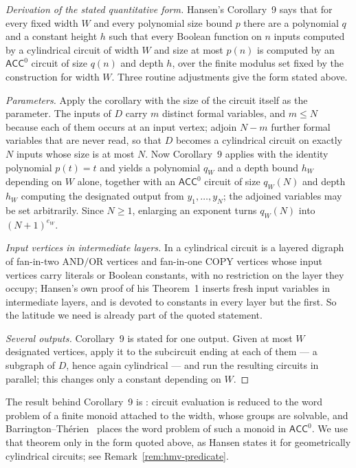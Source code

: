 \documentclass[11pt]{article}
\theoremstyle{definition}
\theoremstyle{remark}
\newcommand{\ACC}{\mathsf{ACC}^0}
\begin{document}
\begin{proof}[Derivation of the stated quantitative form]
Hansen's Corollary~9 says that for every fixed width $W$ and every polynomial size bound
$p$ there are a polynomial $q$ and a constant height $h$ such that every Boolean function
on $n$ inputs computed by a cylindrical circuit of width $W$ and size at most $p(n)$ is
computed by an $\ACC$ circuit of size $q(n)$ and depth $h$, over the finite modulus set
fixed by the construction for width $W$.  Three routine adjustments give the form stated
above.

\emph{Parameters.}  Apply the corollary with the size of the circuit itself as the
parameter.  The inputs of $D$ carry $m$ distinct formal variables, and $m\le N$ because
each of them occurs at an input vertex; adjoin $N-m$ further formal variables that are
never read, so that $D$ becomes a cylindrical circuit on exactly $N$ inputs whose size is
at most $N$.  Now Corollary~9 applies with the identity polynomial $p(t)=t$ and yields a
polynomial $q_W$ and a depth bound $h_W$ depending on $W$ alone, together with an $\ACC$
circuit of size $q_W(N)$ and depth $h_W$ computing the designated output from
$y_1,\dots,y_N$; the adjoined variables may be set arbitrarily.  Since $N\ge 1$, enlarging
an exponent turns $q_W(N)$ into $(N+1)^{e_W}$.

\emph{Input vertices in intermediate layers.}  In \cite{Hansen03,HMV02} a cylindrical
circuit is a layered digraph of fan-in-two $\mathrm{AND}/\mathrm{OR}$ vertices and
fan-in-one $\mathrm{COPY}$ vertices whose input vertices carry literals or Boolean
constants, with no restriction on the layer they occupy; Hansen's own proof of his
Theorem~1 inserts fresh input variables in intermediate layers, and
\cite[Lemma~7]{HMV02} is devoted to constants in every layer but the first.  So the
latitude we need is already part of the quoted statement.

\emph{Several outputs.}  Corollary~9 is stated for one output.  Given at most $W$
designated vertices, apply it to the subcircuit ending at each of them --- a subgraph of
$D$, hence again cylindrical --- and run the resulting circuits in parallel; this changes
only a constant depending on $W$.
\end{proof}

The result behind Corollary~9 is \cite[Theorem~2]{HMV02}: circuit evaluation is reduced
to the word problem of a finite monoid attached to the width, whose groups are solvable,
and Barrington--Th\'erien~\cite{BT88} places the word problem of such a monoid in
$\ACC$.  We use that theorem only in the form quoted above, as Hansen states it for
geometrically cylindrical circuits; see Remark~\ref{rem:hmv-predicate}.
\end{document}
